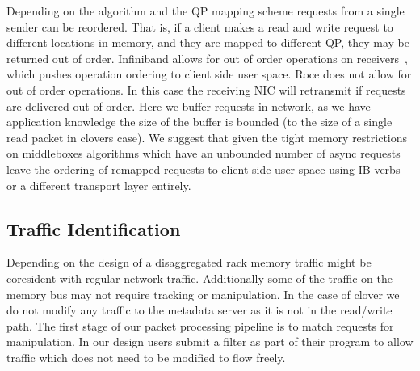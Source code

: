 Depending on the algorithm and the QP mapping scheme requests from a single
sender can be reordered. That is, if a client makes a read and write request to
different locations in memory, and they are mapped to different QP, they may be
returned out of order. Infiniband allows for out of order operations on
receivers~\cite{infiniband-spec}, which pushes operation ordering to client
side user space. Roce does not allow for out of order operations. In this case
the receiving NIC will retransmit if requests are delivered out of order. Here
we buffer requests in network, as we have application knowledge the size of the
buffer is bounded (to the size of a single read packet in clovers case). We
suggest that given the tight memory restrictions on middleboxes algorithms which
have an unbounded number of async requests leave the ordering of remapped
requests to client side user space using IB verbs or a different transport layer
entirely.


\subsection{Traffic Identification} Depending on the design of a disaggregated
rack memory traffic might be coresident with regular network traffic.
Additionally some of the traffic on the memory bus may not require tracking or
manipulation. In the case of clover we do not modify any traffic to the metadata
server as it is not in the read/write path. The first stage of our packet
processing pipeline is to match requests for manipulation. In our design users
submit a filter as part of their program to allow traffic which does not need to
be modified to flow freely.

